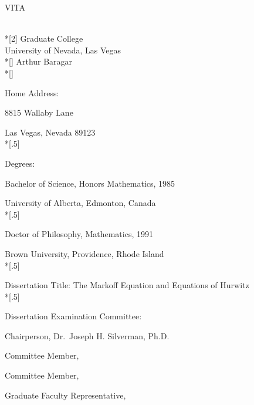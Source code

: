\begin{spacing}{1} %
\thispagestyle{plain} %
\begin{center}
 VITA\\*[2\baselineskip]%
 Graduate College \\
 University of Nevada, Las Vegas \\*[\baselineskip]
 Arthur Baragar\\*[\baselineskip]
\end{center}


\noindent Home Address:

 8815 Wallaby Lane

 Las Vegas, Nevada 89123\\*[.5\baselineskip]

\noindent Degrees:

 Bachelor of Science, Honors Mathematics, 1985

 University of Alberta, Edmonton, Canada\\*[.5\baselineskip]

 Doctor of Philosophy, Mathematics, 1991

 Brown University, Providence, Rhode Island\\*[.5\baselineskip]



\noindent  Dissertation Title: %
The Markoff Equation and Equations of Hurwitz\\*[.5\baselineskip]

\noindent  Dissertation Examination Committee: %

 Chairperson, Dr.~Joseph H. Silverman, Ph.D. %

 Committee Member, %

 Committee Member,

 Graduate Faculty Representative,

\end{spacing}
